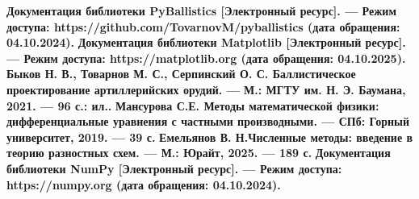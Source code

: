 \documentclass[14pt, a4paper]{extreport} %
\begin{document}
\newpage
\begin{thebibliography}{9}
\bibitem{} \textbf{Документация библиотеки PyBallistics [Электронный ресурс]. — Режим доступа: https://github.com/TovarnovM/pyballistics (дата обращения: 04.10.2024).}
\bibitem{} \textbf{Документация библиотеки Matplotlib [Электронный ресурс]. — Режим доступа: https://matplotlib.org (дата обращения: 04.10.2025).} 
\bibitem{} \textbf{
Быков Н. В., Товарнов М. С., Серпинский О. С. Баллистическое проектирование артиллерийских орудий. — М.: МГТУ им. Н. Э. Баумана, 2021. — 96 с.: ил..} 
\bibitem{} \textbf{Мансурова С.Е. Методы математической физики: дифференциальные уравнения с частными производными. — СПб: Горный университет, 2019. — 39 с.} 
\bibitem{} \textbf{Емельянов В. Н.Численные методы: введение в теорию разностных схем. — М.: Юрайт, 2025. — 189 с.} 
\bibitem{} \textbf{Документация библиотеки NumPy [Электронный ресурс]. — Режим доступа: https://numpy.org (дата обращения: 04.10.2024).}
\end{thebibliography}
\end{document}
